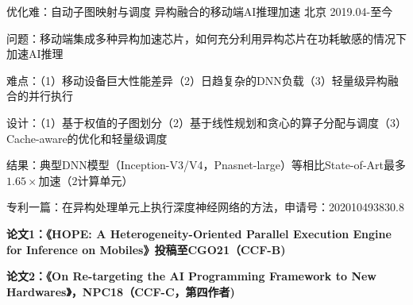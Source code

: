 

\begin{cventries}

  \cventry
    {优化难：自动子图映射与调度} %
    {异构融合的移动端AI推理加速} %
    {北京} %
    {2019.04-至今} %
    {
      \begin{cvitems} %
        \item {问题：移动端集成多种异构加速芯片，如何充分利用异构芯片在功耗敏感的情况下加速AI推理}
        \item {难点：（1）移动设备巨大性能差异（2）日趋复杂的DNN负载（3）轻量级异构融合的并行执行}
        \item {设计：（1）基于权值的子图划分（2）基于线性规划和贪心的算子分配与调度（3）Cache-aware的优化和轻量级调度}
        \item {结果：典型DNN模型（Inception-V3/V4，Pnasnet-large）等相比State-of-Art最多$1.65\times$加速（$2$计算单元）}
        \item {专利一篇：在异构处理单元上执行深度神经网络的方法，申请号：202010493830.8}
        \item {\textbf{{\color{awesome-red}论文1}：《HOPE: A Heterogeneity-Oriented Parallel Execution Engine for Inference on Mobiles》投稿至CGO21（CCF-B)}}
        \item {\textbf{{\color{awesome-red}论文2}：《On Re-targeting the AI Programming Framework to New Hardwares》，NPC18（CCF-C，第四作者)}}
      \end{cvitems}
    }


\end{cventries}
